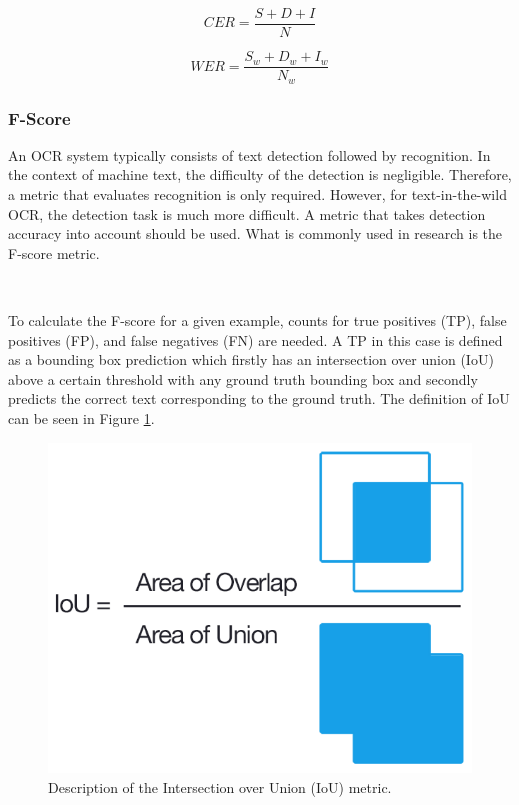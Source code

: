 \documentclass[a4paper,11pt]{article}
\begin{document}
\begin{equation}
\label{eq:CER}
CER=\frac{S+D+I}{N}
\end{equation}

\begin{equation}
\label{eq:WER}
WER=\frac{S_w+D_w+I_w}{N_w}
\end{equation}

\subsubsection{F-Score}
An OCR system typically consists of text detection followed by recognition. In the context of machine text, the difficulty of the detection is negligible. Therefore, a metric that evaluates recognition is only required. However, for text-in-the-wild OCR, the detection task is much more difficult. A metric that takes detection accuracy into account should be used. What is commonly used in research is the F-score metric.

\

\noindent
To calculate the F-score for a given example, counts for true positives (TP), false positives (FP), and false negatives (FN) are needed. A TP in this case is defined as a bounding box prediction which firstly has an intersection over union (IoU) above a certain threshold with any ground truth bounding box and secondly predicts the correct text corresponding to the ground truth. The definition of IoU can be seen in Figure \ref{fig:iou-equation}.

\begin{figure}[H]
\centering
\includegraphics[scale=0.5]{img/iou_equation.png}
\caption{Description of the Intersection over Union (IoU) metric. \cite{iou-object-detection}}
\label{fig:iou-equation}
\end{figure}
\end{document}

